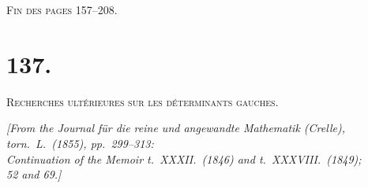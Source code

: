 \documentclass[11pt,a4paper]{book}
\begin{document}
\medskip

\textsc{Fin des pages 157--208.}
\clearpage


\setcounter{page}{209}


\section*{137.}

\textsc{Recherches ult\'{e}rieures sur les d\'{e}terminants gauches.}

\begin{flushright}
\textit{[From the Journal f\"{u}r die reine und angewandte Mathematik (Crelle),}\\
\textit{torn.\ L.\ (1855), pp.\ 299--313:}\\
\textit{Continuation of the Memoir t.\ XXXII.\ (1846) and t.\ XXXVIII.\ (1849);}\\
\textit{52 and 69.]}
\end{flushright}
\end{document}
